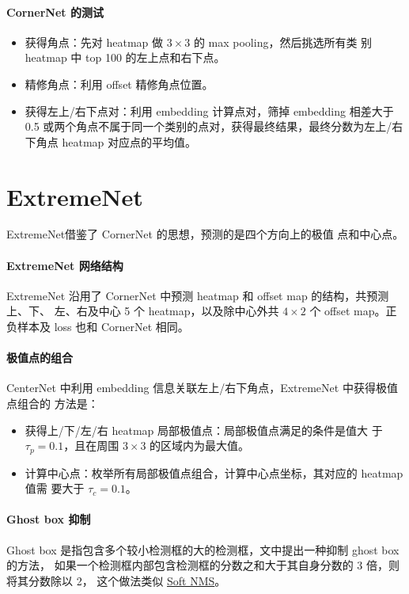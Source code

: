 \paragraph{CornerNet 的测试}
\begin{itemize}
  \item 获得角点：先对 heatmap 做 $3 \times 3$ 的 max pooling，然后挑选所有类
    别 heatmap 中 top 100 的左上点和右下点。
  \item 精修角点：利用 offset 精修角点位置。
  \item 获得左上/右下点对：利用 embedding 计算点对，筛掉 embedding 相差大于 0.5
    或两个角点不属于同一个类别的点对，获得最终结果，最终分数为左上/右下角点
    heatmap 对应点的平均值。
\end{itemize}

\section{ExtremeNet}
\label{sec:ExtremeNet}
ExtremeNet借鉴了 CornerNet 的思想，预测的是四个方向上的极值
点和中心点。

\paragraph{ExtremeNet 网络结构}
ExtremeNet 沿用了 CornerNet 中预测 heatmap 和 offset map 的结构，共预测上、下、
左、右及中心 5 个 heatmap，以及除中心外共 $4 \times 2$ 个 offset map。正负样本及
loss 也和 CornerNet 相同。

\paragraph{极值点的组合}
CenterNet 中利用 embedding 信息关联左上/右下角点，ExtremeNet 中获得极值点组合的
方法是：

\begin{itemize}
  \item 获得上/下/左/右 heatmap 局部极值点：局部极值点满足的条件是值大
    于 $\tau_p=0.1$，且在周围 $3 \times 3$ 的区域内为最大值。
  \item 计算中心点：枚举所有局部极值点组合，计算中心点坐标，其对应的 heatmap 值需
    要大于 $\tau_c=0.1$。
\end{itemize}

\paragraph{Ghost box 抑制}
Ghost box 是指包含多个较小检测框的大的检测框，文中提出一种抑制 ghost box 的方法，
如果一个检测框内部包含检测框的分数之和大于其自身分数的 3 倍，则将其分数除以 2，
这个做法类似 \hyperref[subsec:soft-nms]{Soft NMS}。

